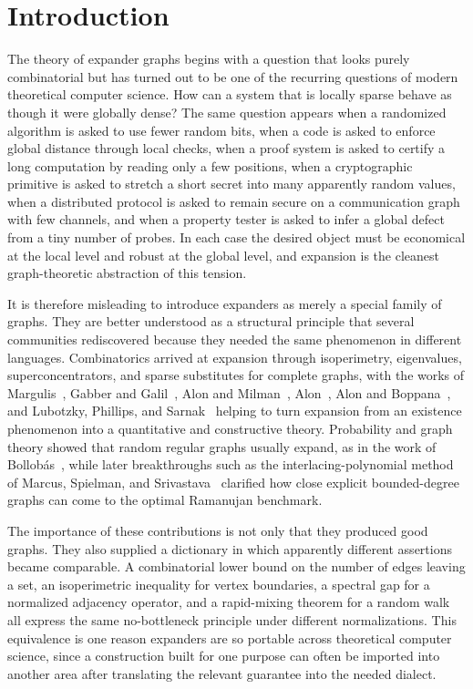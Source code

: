 \section{Introduction}
\label{sec:introduction}

The theory of expander graphs begins with a question that looks purely combinatorial but has turned out to be one of the recurring questions of modern theoretical computer science. How can a system that is locally sparse behave as though it were globally dense? The same question appears when a randomized algorithm is asked to use fewer random bits, when a code is asked to enforce global distance through local checks, when a proof system is asked to certify a long computation by reading only a few positions, when a cryptographic primitive is asked to stretch a short secret into many apparently random values, when a distributed protocol is asked to remain secure on a communication graph with few channels, and when a property tester is asked to infer a global defect from a tiny number of probes. In each case the desired object must be economical at the local level and robust at the global level, and expansion is the cleanest graph-theoretic abstraction of this tension.

It is therefore misleading to introduce expanders as merely a special family of graphs. They are better understood as a structural principle that several communities rediscovered because they needed the same phenomenon in different languages. Combinatorics arrived at expansion through isoperimetry, eigenvalues, superconcentrators, and sparse substitutes for complete graphs, with the works of Margulis~\cite{Mar1973}, Gabber and Galil~\cite{GG1981}, Alon and Milman~\cite{AM1985}, Alon~\cite{Alo1986}, Alon and Boppana~\cite{AB1987}, and Lubotzky, Phillips, and Sarnak~\cite{LPS1988} helping to turn expansion from an existence phenomenon into a quantitative and constructive theory. Probability and graph theory showed that random regular graphs usually expand, as in the work of Bollob{\'a}s~\cite{Bol1988}, while later breakthroughs such as the interlacing-polynomial method of Marcus, Spielman, and Srivastava~\cite{MSS2015} clarified how close explicit bounded-degree graphs can come to the optimal Ramanujan benchmark.

The importance of these contributions is not only that they produced good graphs. They also supplied a dictionary in which apparently different assertions became comparable. A combinatorial lower bound on the number of edges leaving a set, an isoperimetric inequality for vertex boundaries, a spectral gap for a normalized adjacency operator, and a rapid-mixing theorem for a random walk all express the same no-bottleneck principle under different normalizations. This equivalence is one reason expanders are so portable across theoretical computer science, since a construction built for one purpose can often be imported into another area after translating the relevant guarantee into the needed dialect.

